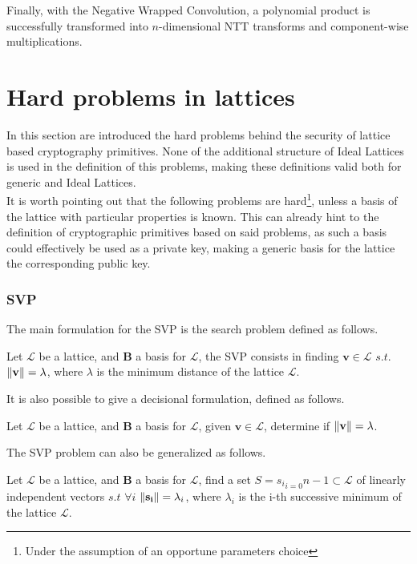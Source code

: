 Finally, with the Negative Wrapped Convolution, a polynomial product is successfully transformed into $n$-dimensional NTT transforms and component-wise multiplications.

\section{Hard problems in lattices}\label{sec:bg:prob}
In this section are introduced the hard problems behind the security of lattice based cryptography primitives. None of the additional structure of Ideal Lattices is used in the definition of this problems, making these definitions valid both for generic and Ideal Lattices.\\
It is worth pointing out that the following problems are hard\footnote{Under the assumption of an opportune parameters choice}, unless a basis of the lattice with particular properties is known. This can already hint to the definition of cryptographic primitives based on said problems, as such a basis could effectively be used as a private key, making a generic basis for the lattice the corresponding public key.

\subsubsection{SVP}

The main formulation for the SVP is the search problem defined as follows.

\begin{definition}
Let $\mathscr{L}$ be a lattice, and $\mathbf{B}$ a basis for $\mathscr{L}$, the SVP consists in finding $\mathbf{v}\in\mathscr{L}$ $s.t.$ $\left\lVert \mathbf{v} \right\rVert = \lambda$, where $\lambda$ is the minimum distance of the lattice $\mathscr{L}$.
\end{definition}

It is also possible to give a decisional formulation, defined as follows.

\begin{definition}
Let $\mathscr{L}$ be a lattice, and $\mathbf{B}$ a basis for $\mathscr{L}$, given $\mathbf{v}\in\mathscr{L}$, determine if $\left\lVert \mathbf{v} \right\rVert = \lambda$.
\end{definition}

The SVP problem can also be generalized as follows.

\begin{definition}
Let $\mathscr{L}$ be a lattice, and $\mathbf{B}$ a basis for $\mathscr{L}$, find a set $S={s_i}_{i=0}{n-1}\subset \mathscr{L}$ of linearly independent vectors $s.t$ $\forall i$ $\left\lVert \mathbf{s_i} \right\rVert = \lambda_i$, where $\lambda_i$ is the i-th successive minimum of the lattice $\mathscr{L}$.
\end{definition}

